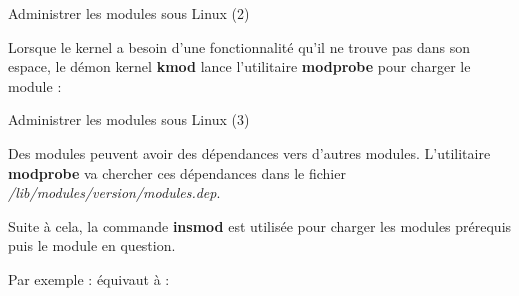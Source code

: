 \documentclass[12pt, t]{beamer}
\begin{document}
\begin{frame}{Administrer les modules sous Linux (2)}

    \vspace{15pt}
    Lorsque le kernel a besoin d'une fonctionnalité qu'il ne trouve pas dans son
    espace, le démon kernel {\textbf{kmod}} lance l'utilitaire {\textbf{modprobe}}
    pour charger le module :

    \vspace{10pt}
    \lstkmod

\end{frame}



\begin{frame}{Administrer les modules sous Linux (3)}

    \vspace{8pt}
    Des modules peuvent avoir des dépendances vers d'autres modules. L'utilitaire
    {\textbf{modprobe}} va chercher ces dépendances dans le fichier
    {\textit{/lib/modules/version/modules.dep}}.

    {
        \vspace{8pt}
        Suite à cela, la commande {\textbf{insmod}} est utilisée pour charger les
        modules prérequis puis le module en question.
    }

    {
        \vspace{8pt}
        Par exemple :
        \vspace{4pt}
        \lstdep
        équivaut à :
        \vspace{4pt}
        \lstdepbis
    }

\end{frame}
\end{document}
